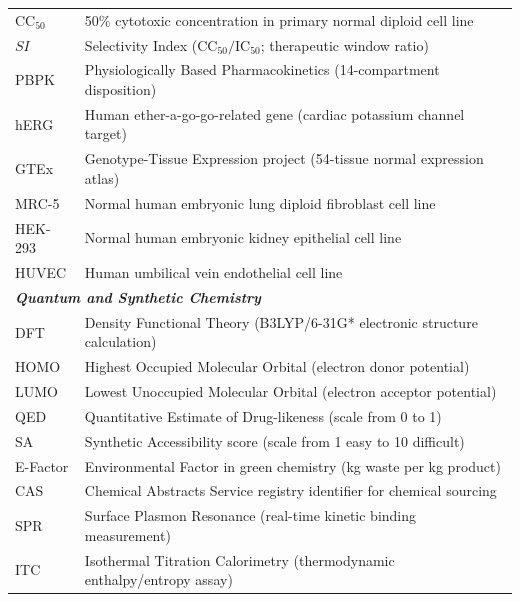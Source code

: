 \begin{table}[h]
{\begin{tabular}{lp{6.2cm}}
$\text{CC}_{50}$ & 50\% cytotoxic concentration in primary normal diploid cell line \\
$SI$ & Selectivity Index ($\text{CC}_{50} / \text{IC}_{50}$; therapeutic window ratio) \\
PBPK & Physiologically Based Pharmacokinetics (14-compartment disposition) \\
hERG & Human ether-a-go-go-related gene (cardiac potassium channel target) \\
GTEx & Genotype-Tissue Expression project (54-tissue normal expression atlas) \\
MRC-5 & Normal human embryonic lung diploid fibroblast cell line \\
HEK-293 & Normal human embryonic kidney epithelial cell line \\
HUVEC & Human umbilical vein endothelial cell line \\
\midrule
\multicolumn{2}{l}{\textit{\textbf{Quantum and Synthetic Chemistry}}} \\
DFT & Density Functional Theory (B3LYP/6-31G* electronic structure calculation) \\
HOMO & Highest Occupied Molecular Orbital (electron donor potential) \\
LUMO & Lowest Unoccupied Molecular Orbital (electron acceptor potential) \\
QED & Quantitative Estimate of Drug-likeness (scale from 0 to 1) \\
SA & Synthetic Accessibility score (scale from 1 easy to 10 difficult) \\
E-Factor & Environmental Factor in green chemistry (kg waste per kg product) \\
CAS & Chemical Abstracts Service registry identifier for chemical sourcing \\
SPR & Surface Plasmon Resonance (real-time kinetic binding measurement) \\
ITC & Isothermal Titration Calorimetry (thermodynamic enthalpy/entropy assay) \\
\bottomrule
\end{tabular}%
}
\end{table}

